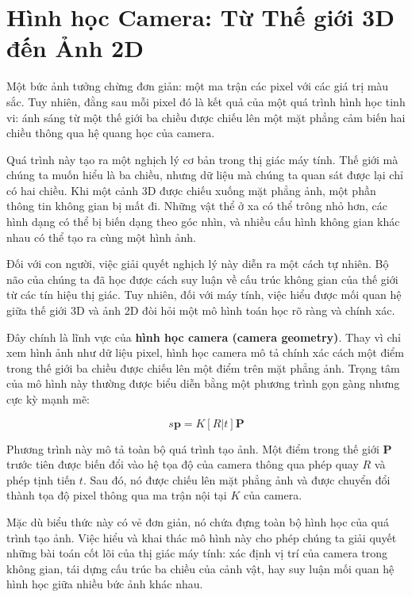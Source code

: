 \chapter{Hình học Camera: Từ Thế giới 3D đến Ảnh 2D}
\label{chap:camera_geometry}


Một bức ảnh tưởng chừng đơn giản: một ma trận các pixel với các giá trị màu sắc. Tuy nhiên, đằng sau mỗi pixel đó là kết quả của một quá trình hình học tinh vi: ánh sáng từ một thế giới ba chiều được chiếu lên một mặt phẳng cảm biến hai chiều thông qua hệ quang học của camera.

Quá trình này tạo ra một nghịch lý cơ bản trong thị giác máy tính. Thế giới mà chúng ta muốn hiểu là ba chiều, nhưng dữ liệu mà chúng ta quan sát được lại chỉ có hai chiều. Khi một cảnh 3D được chiếu xuống mặt phẳng ảnh, một phần thông tin không gian bị mất đi. Những vật thể ở xa có thể trông nhỏ hơn, các hình dạng có thể bị biến dạng theo góc nhìn, và nhiều cấu hình không gian khác nhau có thể tạo ra cùng một hình ảnh.

Đối với con người, việc giải quyết nghịch lý này diễn ra một cách tự nhiên. Bộ não của chúng ta đã học được cách suy luận về cấu trúc không gian của thế giới từ các tín hiệu thị giác. Tuy nhiên, đối với máy tính, việc hiểu được mối quan hệ giữa thế giới 3D và ảnh 2D đòi hỏi một mô hình toán học rõ ràng và chính xác.

Đây chính là lĩnh vực của \textbf{hình học camera (camera geometry)}. Thay vì chỉ xem hình ảnh như dữ liệu pixel, hình học camera mô tả chính xác cách một điểm trong thế giới ba chiều được chiếu lên một điểm trên mặt phẳng ảnh. Trọng tâm của mô hình này thường được biểu diễn bằng một phương trình gọn gàng nhưng cực kỳ mạnh mẽ:

\[
s\mathbf{p} = K [R|t] \mathbf{P}
\]

Phương trình này mô tả toàn bộ quá trình tạo ảnh. Một điểm trong thế giới $\mathbf{P}$ trước tiên được biến đổi vào hệ tọa độ của camera thông qua phép quay $R$ và phép tịnh tiến $t$. Sau đó, nó được chiếu lên mặt phẳng ảnh và được chuyển đổi thành tọa độ pixel thông qua ma trận nội tại $K$ của camera. 

Mặc dù biểu thức này có vẻ đơn giản, nó chứa đựng toàn bộ hình học của quá trình tạo ảnh. Việc hiểu và khai thác mô hình này cho phép chúng ta giải quyết những bài toán cốt lõi của thị giác máy tính: xác định vị trí của camera trong không gian, tái dựng cấu trúc ba chiều của cảnh vật, hay suy luận mối quan hệ hình học giữa nhiều bức ảnh khác nhau.

